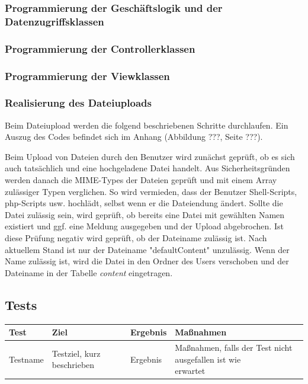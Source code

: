 \documentclass[10pt]{article}
\begin{document}
\subsubsection{Programmierung der Geschäftslogik und der Datenzugriffsklassen}
\subsubsection{Programmierung der Controllerklassen}
\subsubsection{Programmierung der Viewklassen}
\subsubsection{Realisierung des Dateiuploads}


Beim Dateiupload werden die folgend beschriebenen Schritte durchlaufen. Ein Auszug des Codes befindet sich im Anhang (Abbildung ???, Seite ???).

Beim Upload von Dateien durch den Benutzer wird zunächst geprüft, ob es sich auch tatsächlich und eine hochgeladene Datei handelt. Aus Sicherheitsgründen werden danach die MIME-Types der Dateien geprüft und mit einem Array zulässiger Typen verglichen. So wird vermieden, dass der Benutzer Shell-Scripts, php-Scripts usw. hochlädt, selbst wenn er die Dateiendung ändert. Sollte die Datei zulässig sein, wird geprüft, ob bereits eine Datei mit gewählten Namen existiert und ggf. eine Meldung ausgegeben und der Upload abgebrochen. Ist diese Prüfung negativ wird geprüft, ob der Dateiname zulässig ist. Nach aktuellem Stand ist nur der Dateiname "defaultContent" unzulässig. Wenn der Name zulässig ist, wird die Datei in den Ordner des Users verschoben und der Dateiname in der Tabelle \textit{content} eingetragen.

\subsection{Tests}

\begin{table}[ht!]
\begin{tabularx}{\textwidth}{l | l | l | l}

\textbf{Test}  & \textbf{Ziel}  & \textbf{Ergebnis} & \textbf{Maßnahmen}\\
\hline
Testname  & Testziel, kurz beschrieben  & Ergebnis & \makecell[l]{Maßnahmen, falls der Test nicht ausgefallen ist wie \\ erwartet}\\

\end{tabularx}
\end{table}
\end{document}
